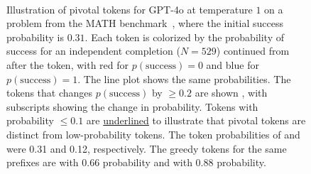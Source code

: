 \begin{figure}
\begin{AIbox}{}
    \tt \footnotesize
    \begin{minipage}{0.95\textwidth}
    
    \vspace{-1em}
    \end{minipage}
    
    \vspace{-2.5em}
    \end{AIbox}
    \caption{Illustration of pivotal tokens for GPT-4o at temperature $1$ on a problem from the MATH benchmark~\cite{hendrycksmath2021}, where the
 initial success probability is $0.31$. Each token is colorized by the probability of success for an independent completion ($N=529$) continued from after the token, with \textcolor{red!100!black}{red for $p(\mathrm{success})=0$} and \textcolor{blue!100!black}{blue for $p(\mathrm{success})=1$}. The line plot shows the same probabilities. The tokens that changes $p(\mathrm{success})$ by $\ge 0.2$ are shown , with subscripts showing the change in probability. Tokens with probability $\leq 0.1$ are \underline{underlined} to illustrate that pivotal tokens are distinct from low-probability tokens. The token probabilities of  and  were 0.31 and 0.12, respectively. The greedy tokens for the same prefixes are  with 0.66 probability and  with 0.88 probability.}
    \label{fig:pivotal-token-example}
\end{figure}
